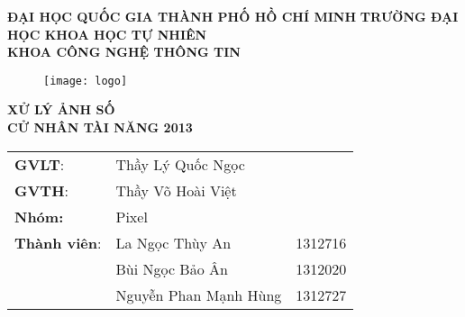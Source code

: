 \begin{titlepage}
	\begin{center}
		\large{\textbf{ĐẠI HỌC QUỐC GIA THÀNH PHỐ HỒ CHÍ MINH}}
		\large{\textbf{TRƯỜNG ĐẠI HỌC KHOA HỌC TỰ NHIÊN}}\\
		\large{\textbf{KHOA CÔNG NGHỆ THÔNG TIN}}\\
		
		\begin{figure}[H]
			\centerline{\texttt{[image: logo]}}
		\end{figure}
		\vfill
		
		\large{\textbf{XỬ LÝ ẢNH SỐ}}\\
		\large{\textbf{CỬ NHÂN TÀI NĂNG 2013}}\\
	\end{center}
	\vfill
	
	\vfill
	
	\begin{flushright}
		\begin{tabular}{l l l}
			\textbf{GVLT}: & Thầy Lý Quốc Ngọc\\
			\textbf{GVTH}: & Thầy Võ Hoài Việt\\
			\textbf{Nhóm:} & Pixel\\
			\textbf{Thành viên}: & La Ngọc Thùy An & 1312716\\
			& Bùi Ngọc Bảo Ân & 1312020\\
			& Nguyễn Phan Mạnh Hùng & 1312727\\
		\end{tabular}
	\end{flushright}
\end{titlepage}
